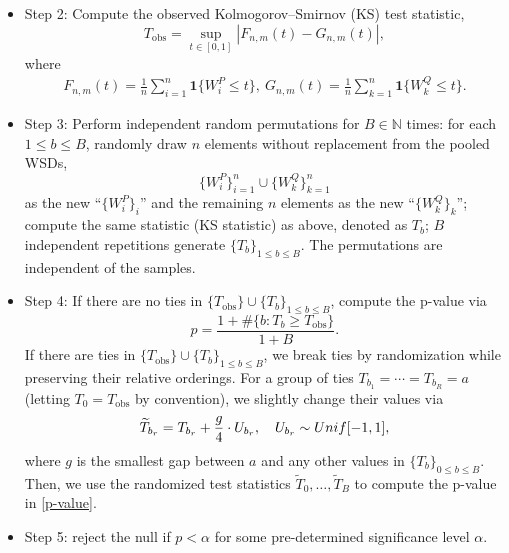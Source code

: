 \documentclass{imsart}
\numberwithin{equation}{section}
\def\N{\mathbb{N}}
\def\N{\mathbb N}
\begin{document}
\begin{itemize}
	\item Step 2: Compute the observed Kolmogorov–Smirnov (KS) test statistic, 
	\begin{equation*}
		T_{\text{obs}} = \sup_{t \in [0,1]} | F_{n,m}(t) -G_{n,m}(t) |,
	\end{equation*}
	where     
	\begin{align*}
		F_{n,m}(t) = \frac{1}{n}\sum_{i=1}^n \mathbf{1}\{ W^P_i \leq t \}, \ G_{n,m}(t) = \frac{1}{n}\sum_{k=1}^n \mathbf{1}\{ W^Q_k \leq t \}.
	\end{align*}
	\item Step 3: Perform independent random permutations for $B\in \N$ times: for each $1\leq b\leq B$, randomly draw $n$ elements
	without replacement
	from the pooled WSDs,
	\begin{equation*}
		\{ W^P_i\}_{i=1}^n \cup  \{ W^Q_k \}_{k=1}^n 
	\end{equation*}
	as the new ``$\{ W^P_i \}_i$'' and the remaining $n$ elements as the new ``$\{ W^Q_k \}_k$''; compute the same statistic (KS statistic) as above, denoted as $T_b$;   
	$B$ independent repetitions generate $\{ T_b \}_{1\leq b\leq B}$. The permutations are independent of the samples.
	\item Step 4: If there are no ties in $ \{T_{\text{obs}}\} \cup \{ T_b \}_{1\leq b\leq B}$, compute the p-value via
	\begin{equation}\label{p-value}
		p = \frac{ 1+ \#\{b: T_b\geq T_{\text{obs}} \} }{ 1+B }.
	\end{equation}
	If there are ties in  $ \{T_{\text{obs}}\} \cup \{ T_b \}_{1\leq b\leq B}$, we break ties by randomization while preserving their relative orderings. For a group of ties $T_{b_1} = \cdots = T_{b_R} =a$ (letting $T_0 = T_{\text{obs}}$ by convention), we slightly change their values via
	\begin{equation*}
		\widetilde{T}_{b_r} = T_{b_r} + \frac{g}{4}\cdot U_{b_r}, \quad U_{b_r}\sim \rm{Unif}[-1,1],
	\end{equation*}
	where $g$ is the smallest gap between $a$ and any other values in $\{ T_b \}_{0\leq b\leq B}$. Then, we use the randomized test statistics $\widetilde{T}_0,\dots,\widetilde{T}_B$ to compute the p-value in \eqref{p-value}.
	\item Step 5: reject the null if $p < \alpha$ for some pre-determined significance level $\alpha$. 
\end{itemize}
\end{document}
